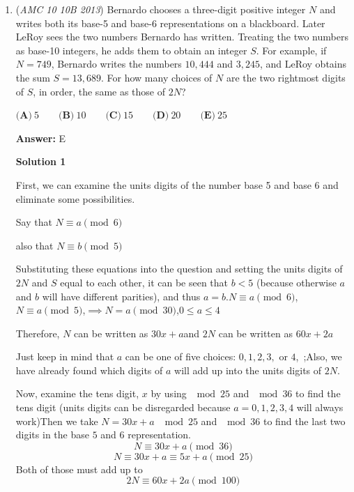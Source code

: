 \begin{enumerate}
 \textbf{Shortcut} After deducing that $2012$ and case $1$ is impossible, and since there is no option for $0$, $2016$ is obviously a solution and the answer is $\boxed{\textbf{(A)}\ 1}$.

 -mathboy282

 


	\item (\textit{AMC 10 10B 2013}) Bernardo chooses a three-digit positive integer $N$ and writes both its base-5 and base-6 representations on a blackboard. Later LeRoy sees the two numbers Bernardo has written. Treating the two numbers as base-10 integers, he adds them to obtain an integer $S$. For example, if $N = 749$, Bernardo writes the numbers $10,444$ and $3,245$, and LeRoy obtains the sum $S = 13,689$. For how many choices of $N$ are the two rightmost digits of $S$, in order, the same as those of $2N$?


 $\textbf{(A)}\ 5 \qquad\textbf{(B)}\ 10 \qquad\textbf{(C)}\ 15 \qquad\textbf{(D)}\ 20 \qquad\textbf{(E)}\ 25$

 \textbf{Answer: }E



\textbf{Solution 1}

First, we can examine the units digits of the number base 5 and base 6 and eliminate some possibilities.

 Say that $N \equiv a \pmod{6}$

 also that $N \equiv b \pmod{5}$

 Substituting these equations into the question and setting the units digits of $2N$ and $S$ equal to each other, it can be seen that $b < 5$ (because otherwise $a$ and $b$ will have different parities), and thus $a=b$.$N \equiv a \pmod{6}$,$N \equiv  a \pmod{5}$,$\implies N=a \pmod{30}$,$0 \le a \le 4$

 Therefore, $N$ can be written as  $30x+a$and $2N$ can be written as $60x+2a$ 

 Just keep in mind that $a$ can be one of five choices: $0, 1, 2, 3,$ or $4$, ;Also, we have already found which digits of $a$ will add up into the units digits of $2N$.

 Now, examine the tens digit, $x$ by using $\mod{25}$ and $\mod{36}$ to find the tens digit (units digits can be disregarded because $a=0,1,2,3,4$ will always work)Then we take $N=30x+a$ $\mod{25}$ and $\mod{36}$ to find the last two digits in the base $5$ and $6$ representation.
 \[N \equiv 30x + a \pmod{36}\]
 \[N \equiv 30x + a \equiv 5x + a \pmod{25}\] Both of those must add up to 
 \[2N\equiv60x + 2a \pmod{100}\]


\end{enumerate}
